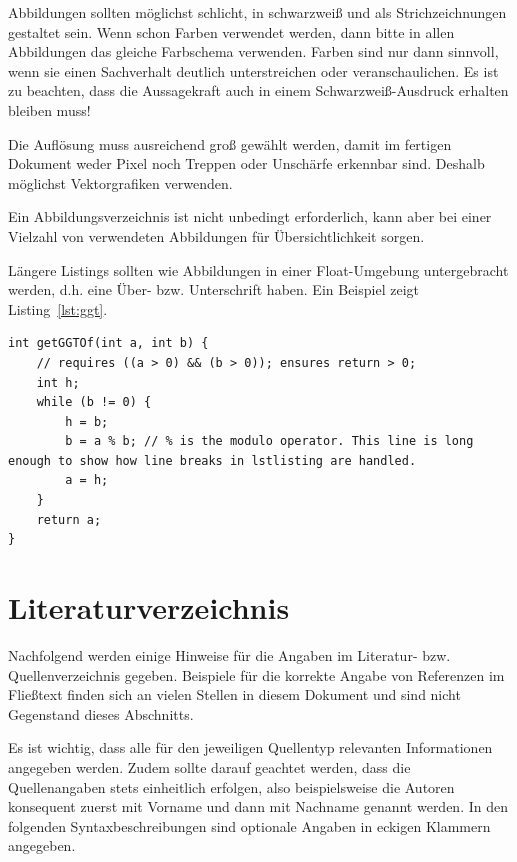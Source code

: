 \documentclass[
    fontsize=12pt,
    headings=small,
    parskip=half,           %
    bibliography=totoc,
    numbers=noenddot,       %
    open=any,               %
    ]{scrreprt}
\begin{document}
Abbildungen sollten möglichst schlicht, in schwarzweiß und als Strichzeichnungen gestaltet sein. Wenn schon Farben verwendet werden, dann bitte in allen Abbildungen das gleiche Farbschema verwenden. Farben sind nur dann sinnvoll, wenn sie einen Sachverhalt deutlich unterstreichen oder veranschaulichen. Es ist zu beachten, dass die Aussagekraft auch in einem Schwarzweiß-Ausdruck erhalten bleiben muss!

Die Auflösung muss ausreichend groß gewählt werden, damit im fertigen Dokument weder Pixel noch Treppen oder Unschärfe erkennbar sind. Deshalb möglichst Vektorgrafiken verwenden.

Ein Abbildungsverzeichnis ist nicht unbedingt erforderlich, kann aber bei einer Vielzahl von verwendeten Abbildungen für Übersichtlichkeit sorgen.

Längere Listings sollten wie Abbildungen in einer Float-Umgebung untergebracht werden, d.h. eine Über- bzw. Unterschrift haben. Ein Beispiel zeigt Listing~\ref{lst:ggt}.

\begin{lstlisting}[float,caption={Berechnung des größten gemeinsamen Teilers zweier ganzer Zahlen a und b},label={lst:ggt}]
int getGGTOf(int a, int b) {
    // requires ((a > 0) && (b > 0)); ensures return > 0;
    int h;
    while (b != 0) {
        h = b;
        b = a % b; // % is the modulo operator. This line is long enough to show how line breaks in lstlisting are handled.
        a = h;
    }
    return a;
}
\end{lstlisting}

\section{Literaturverzeichnis}

Nachfolgend werden einige Hinweise für die Angaben im Literatur- bzw. Quellenverzeichnis gegeben. Beispiele für die korrekte Angabe von Referenzen im Fließtext finden sich an vielen Stellen in diesem Dokument und sind nicht Gegenstand dieses Abschnitts.

Es ist wichtig, dass alle für den jeweiligen Quellentyp relevanten Informationen angegeben werden. Zudem sollte darauf geachtet werden, dass die Quellenangaben stets einheitlich erfolgen, also beispielsweise die Autoren konsequent zuerst mit Vorname und dann mit Nachname genannt werden. In den folgenden Syntaxbeschreibungen sind optionale Angaben in eckigen Klammern angegeben.
\end{document}
